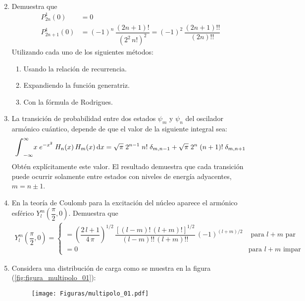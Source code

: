\documentclass[12pt]{article}
\def\scaleint#1{\vcenter{\hbox{\scaleto[3ex]{\displaystyle\int}{#1}}}}
\numberwithin{equation}{section}
\begin{document}
\begin{enumerate}
\begin{align*}
\end{align*}
\item Demuestra que
\begin{align*}
P_{2n}^{1} (0) &= 0 \\
P_{2n+1}^{1} (0) &= (-1)^{n} \, \dfrac{(2n + 1)!}{(2^{2} \, n!)^{2}} = (-1)^{2} \, \dfrac{(2n + 1)!!}{(2n)!!}
\end{align*}
Utilizando cada uno de los siguientes métodos:
\begin{enumerate}[label=\alph*)]
\item Usando la relación de recurrencia.
\item Expandiendo la función generatriz.
\item Con la fórmula de Rodrigues.
\end{enumerate}
\item La transición de probabilidad entre dos estados $\psi_{m}$ y $\psi_{n}$ del oscilador armónico cuántico, depende de que el valor de la siguiente integral sea:
\begin{align*}
\scaleint{6ex}_{-\infty}^{\infty} x \; e^{-x^{2}} \; H_{n} (x) \, H_{m}(x) \dd{x} = \sqrt{\pi} \; 2^{n-1} \; n! \; \delta_{m,n-1} + \sqrt{\pi} \; 2^{n} \; (n+1)! \; \delta_{m,n+1}
\end{align*}
Obtén explícitamente este valor. El resultado demuestra que cada transición puede ocurrir solamente entre estados con niveles de energía adyacentes, \break \hfill $m = n \pm 1$.
\item En la teoría de Coulomb para la excitación del núcleo aparece el armónico esférico $Y_{l}^{m} \left( \dfrac{\pi}{2}, 0 \right)$. Demuestra que
\begin{align*}
Y_{l}^{m} \left( \dfrac{\pi}{2}, 0 \right) = \begin{cases}
= \left( \dfrac{2 \, l +1}{4 \, \pi} \right)^{1/2} \, \dfrac{\left[ (l - m)! \, (l + m)! \right]^{1/2}}{(l - m)!! \, (l + m)!!} \, (-1)^{(l + m)/2} & \mbox{ para } l + m \mbox{ par} \\[0.5em]
= 0 & \mbox{para } l + m \mbox{ impar}
\end{cases}
\end{align*}
\item Considera una distribución de carga como se muestra en la figura (\ref{fig:figura_multipolo_01}):
\begin{figure}[H]
    \centering
    \texttt{[image: Figuras/multipolo\_01.pdf]}

\end{figure}
\end{enumerate}
\end{document}
